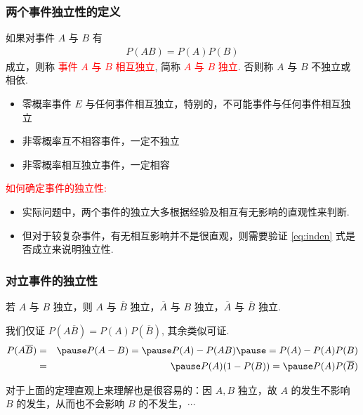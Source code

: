 \begin{frame}
  \frametitle{两个事件独立性的定义}
  \begin{defi}
    如果对事件 $A$ 与 $B$ 有
    \begin{eqnarray*}
      P(AB)=P(A)P(B)
    \end{eqnarray*}
    成立，则称 \textcolor{red}{事件 $A$ 与 $B$ 相互独立}, 简称 \textcolor{red}{$A$ 与 $B$ 独立}. 否则称 $A$ 与 $B$ 不独立或相依.
  \end{defi}

\begin{rmk}
	\begin{itemize}
		\item 零概率事件 $E$ 与任何事件相互独立，特别的，不可能事件与任何事件相互独立
        \item 非零概率互不相容事件，一定不独立
        \item 非零概率相互独立事件，一定相容
\end{itemize}


\end{rmk}

\pause
  \textcolor{red}{如何确定事件的独立性: }
  \begin{itemize}[<+-|alert@+>]
  \item 实际问题中，两个事件的独立大多根据经验及相互有无影响的直观性来判断.
  \item 但对于较复杂事件，有无相互影响并不是很直观，则需要验证 \eqref{eq:inden} 式是否成立来说明独立性.
  \end{itemize}
\end{frame}


 \begin{frame}
	\frametitle{对立事件的独立性}
	\begin{thm}
		若 $A$ 与 $B$ 独立，则 $A$ 与 $\overline{B}$ 独立，$\overline{A}$ 与 $B$ 独立，$\overline{A}$ 与 $\overline{B}$ 独立.
	\end{thm}
	\pause

	\zheng 我们仅证 $P (A\overline{B})=P (A) P (\overline{B})$, 其余类似可证.
	\begin{eqnarray*}
		P(A\overline{B})&=&\pause P(A-B)=\pause P(A)-P(AB)\pause =P(A)-P(A)P(B)\\
		&=&\pause P(A)(1-P(B))=\pause P(A)P(\overline{B})
	\end{eqnarray*}

	\pause
	对于上面的定理直观上来理解也是很容易的：因 $A,B$ 独立，故 $A$ 的发生不影响 $B$ 的发生，从而也不会影响 $B$ 的不发生，$\cdots$
\end{frame}









